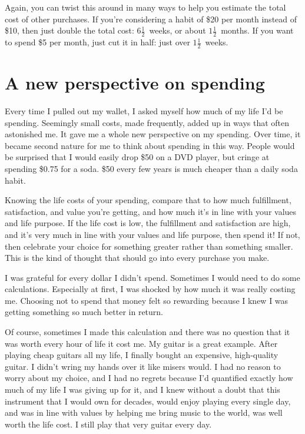 Again, you can twist this around in many ways to help you estimate the total cost of other purchases. If you're considering a habit of \$20 per month instead of \$10, then just double the total cost: $6\frac{1}{2}$~weeks, or about $1\frac{1}{2}$~months. If you want to spend \$5 per month, just cut it in half: just over $1\frac{1}{2}$~weeks.

\section{A new perspective on spending}
Every time I pulled out my wallet, I asked myself how much of my life I'd be spending. Seemingly small costs, made frequently, added up in ways that often astonished me. It gave me a whole new perspective on my spending. Over time, it became second nature for me to think about spending in this way. People would be surprised that I would easily drop \$50 on a DVD player, but cringe at spending \$0.75 for a soda. \$50 every few years is much cheaper than a daily soda habit.

Knowing the life costs of your spending, compare that to how much fulfillment, satisfaction, and value you're getting, and how much it's in line with your values and life purpose. If the life cost is low, the fulfillment and satisfaction are high, and it's very much in line with your values and life purpose, then spend it! If not, then celebrate your choice for something greater rather than something smaller. This is the kind of thought that should go into every purchase you make.

I was grateful for every dollar I didn't spend. Sometimes I would need to do some calculations. Especially at first, I was shocked by how much it was really costing me. Choosing not to spend that money felt so rewarding because I knew I was getting something so much better in return.

Of course, sometimes I made this calculation and there was no question that it was worth every hour of life it cost me. My guitar is a great example. After playing cheap guitars all my life, I finally bought an expensive, high-quality guitar. I didn't wring my hands over it like misers would. I had no reason to worry about my choice, and I had no regrets because I'd quantified exactly how much of my life I was giving up for it, and I knew without a doubt that this instrument that I would own for decades, would enjoy playing every single day, and was in line with values by helping me bring music to the world, was well worth the life cost. I still play that very guitar every day.

